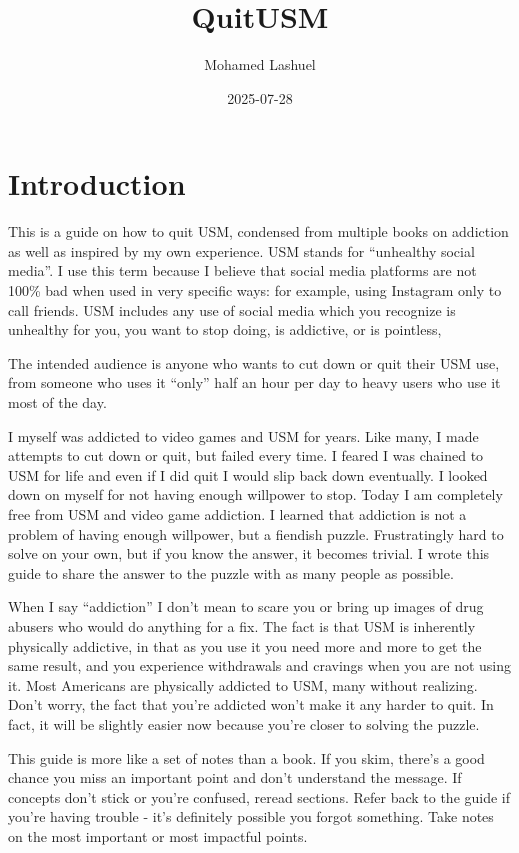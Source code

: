 \documentclass[
]{book}
\title{QuitUSM}
\author{Mohamed Lashuel}
\date{2025-07-28}
\begin{document}
\maketitle

{
\setcounter{tocdepth}{1}
\tableofcontents
}
\chapter{Introduction}\label{introduction}

This is a guide on how to quit USM, condensed from multiple books on addiction as well as inspired by my own experience. USM stands for ``unhealthy social media''. I use this term because I believe that social media platforms are not 100\% bad when used in very specific ways: for example, using Instagram only to call friends. USM includes any use of social media which you recognize is unhealthy for you, you want to stop doing, is addictive, or is pointless,

The intended audience is anyone who wants to cut down or quit their USM use, from someone who uses it ``only'' half an hour per day to heavy users who use it most of the day.

I myself was addicted to video games and USM for years. Like many, I made attempts to cut down or quit, but failed every time. I feared I was chained to USM for life and even if I did quit I would slip back down eventually. I looked down on myself for not having enough willpower to stop. Today I am completely free from USM and video game addiction. I learned that addiction is not a problem of having enough willpower, but a fiendish puzzle. Frustratingly hard to solve on your own, but if you know the answer, it becomes trivial. I wrote this guide to share the answer to the puzzle with as many people as possible.

When I say ``addiction'' I don't mean to scare you or bring up images of drug abusers who would do anything for a fix. The fact is that USM is inherently physically addictive, in that as you use it you need more and more to get the same result, and you experience withdrawals and cravings when you are not using it. Most Americans are physically addicted to USM, many without realizing. Don't worry, the fact that you're addicted won't make it any harder to quit. In fact, it will be slightly easier now because you're closer to solving the puzzle.

This guide is more like a set of notes than a book. If you skim, there's a good chance you miss an important point and don't understand the message. If concepts don't stick or you're confused, reread sections. Refer back to the guide if you're having trouble - it's definitely possible you forgot something. Take notes on the most important or most impactful points.
\end{document}

